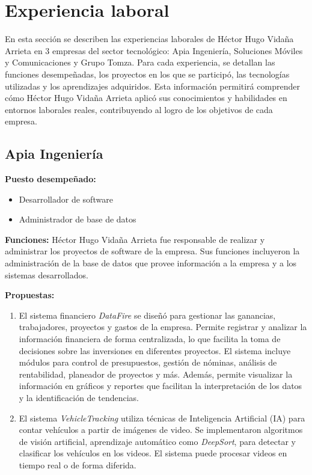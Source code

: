 \documentclass[protocolo.tex]{subfiles}
\begin{document}
\newpage 
\section{Experiencia laboral}

En esta sección se describen las experiencias laborales de 
Héctor Hugo Vidaña Arrieta en 3 empresas del sector tecnológico: 
Apia Ingeniería, Soluciones Móviles y Comunicaciones y Grupo Tomza. 
Para cada experiencia, se detallan las funciones desempeñadas, 
los proyectos en los que se participó, las tecnologías utilizadas y 
los aprendizajes adquiridos. Esta información permitirá comprender cómo Héctor Hugo Vidaña Arrieta aplicó sus conocimientos y habilidades en entornos laborales reales, contribuyendo al logro de los objetivos de cada empresa.

\subsection{Apia Ingeniería}

\textbf{Puesto desempeñado:} 
\begin{itemize}
\item Desarrollador de software
\item Administrador de base de datos
\end{itemize}

\textbf{Funciones:}
Héctor Hugo Vidaña Arrieta fue responsable de realizar y administrar los proyectos de software de la empresa. Sus funciones incluyeron la administración de la base de datos que provee información a la empresa y a los sistemas desarrollados.\vspace{5mm} 

\textbf{Propuestas:}
\begin{enumerate}
\item El sistema financiero \textit{DataFire} se diseñó para gestionar las ganancias,  trabajadores,  proyectos  y  gastos  de  la  empresa.  Permite  registrar  y  analizar  la  información  financiera  de  forma  centralizada,  lo  que  facilita  la  toma  de  decisiones  sobre  las  inversiones  en  diferentes  proyectos.  El  sistema  incluye  módulos  para  control  de  presupuestos,  gestión  de  nóminas,  análisis  de  rentabilidad, planeador de proyectos y más.  Además,  permite  visualizar  la  información  en  gráficos  y  reportes  que  facilitan  la  interpretación  de  los  datos  y  la  identificación  de  tendencias.
\item El sistema \textit{VehicleTracking} utiliza técnicas de Inteligencia Artificial (IA) para  contar  vehículos  a  partir  de  imágenes  de  video.  Se  implementaron  algoritmos  de visión  artificial,  aprendizaje  automático como \textit{DeepSort}, para  detectar  y  clasificar  los  vehículos  en  los  videos.  El  sistema  puede  procesar  videos  en  tiempo  real  o  de  forma  diferida.

\end{enumerate}
\end{document}
